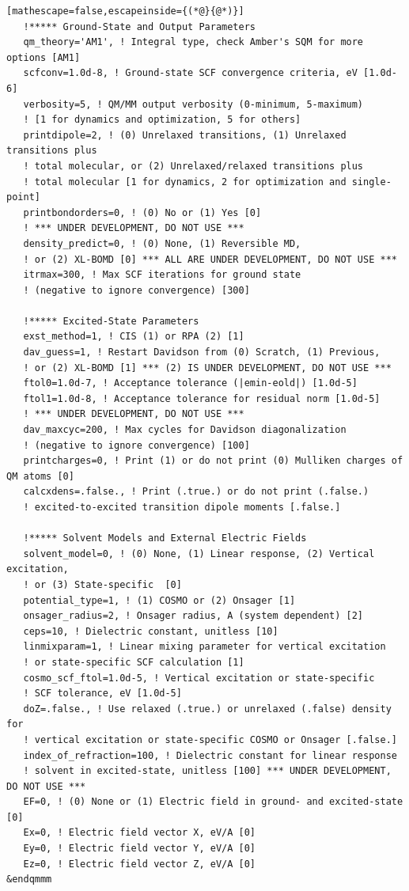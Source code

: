\documentclass[letterpaper,12pt,titlepage]{article}
\begin{document}
\begin{appendix}
\begin{lstlisting}[mathescape=false,escapeinside={(*@}{@*)}]
   !***** Ground-State and Output Parameters
   qm_theory='AM1', ! Integral type, check Amber's SQM for more options [AM1]
   scfconv=1.0d-8, ! Ground-state SCF convergence criteria, eV [1.0d-6]
   verbosity=5, ! QM/MM output verbosity (0-minimum, 5-maximum)
   ! [1 for dynamics and optimization, 5 for others]
   printdipole=2, ! (0) Unrelaxed transitions, (1) Unrelaxed transitions plus 
   ! total molecular, or (2) Unrelaxed/relaxed transitions plus 
   ! total molecular [1 for dynamics, 2 for optimization and single-point]
   printbondorders=0, ! (0) No or (1) Yes [0]
   ! *** UNDER DEVELOPMENT, DO NOT USE ***
   density_predict=0, ! (0) None, (1) Reversible MD, 
   ! or (2) XL-BOMD [0] *** ALL ARE UNDER DEVELOPMENT, DO NOT USE ***
   itrmax=300, ! Max SCF iterations for ground state 
   ! (negative to ignore convergence) [300]

   !***** Excited-State Parameters
   exst_method=1, ! CIS (1) or RPA (2) [1]
   dav_guess=1, ! Restart Davidson from (0) Scratch, (1) Previous, 
   ! or (2) XL-BOMD [1] *** (2) IS UNDER DEVELOPMENT, DO NOT USE ***
   ftol0=1.0d-7, ! Acceptance tolerance (|emin-eold|) [1.0d-5]
   ftol1=1.0d-8, ! Acceptance tolerance for residual norm [1.0d-5] 
   ! *** UNDER DEVELOPMENT, DO NOT USE ***
   dav_maxcyc=200, ! Max cycles for Davidson diagonalization 
   ! (negative to ignore convergence) [100]
   printcharges=0, ! Print (1) or do not print (0) Mulliken charges of QM atoms [0]
   calcxdens=.false., ! Print (.true.) or do not print (.false.) 
   ! excited-to-excited transition dipole moments [.false.]

   !***** Solvent Models and External Electric Fields
   solvent_model=0, ! (0) None, (1) Linear response, (2) Vertical excitation, 
   ! or (3) State-specific  [0]
   potential_type=1, ! (1) COSMO or (2) Onsager [1]
   onsager_radius=2, ! Onsager radius, A (system dependent) [2]
   ceps=10, ! Dielectric constant, unitless [10]
   linmixparam=1, ! Linear mixing parameter for vertical excitation
   ! or state-specific SCF calculation [1]
   cosmo_scf_ftol=1.0d-5, ! Vertical excitation or state-specific
   ! SCF tolerance, eV [1.0d-5]
   doZ=.false., ! Use relaxed (.true.) or unrelaxed (.false) density for 
   ! vertical excitation or state-specific COSMO or Onsager [.false.]
   index_of_refraction=100, ! Dielectric constant for linear response 
   ! solvent in excited-state, unitless [100] *** UNDER DEVELOPMENT, DO NOT USE ***
   EF=0, ! (0) None or (1) Electric field in ground- and excited-state [0]
   Ex=0, ! Electric field vector X, eV/A [0]
   Ey=0, ! Electric field vector Y, eV/A [0]
   Ez=0, ! Electric field vector Z, eV/A [0] 
&endqmmm


\end{lstlisting}
\end{appendix}
\end{document}
